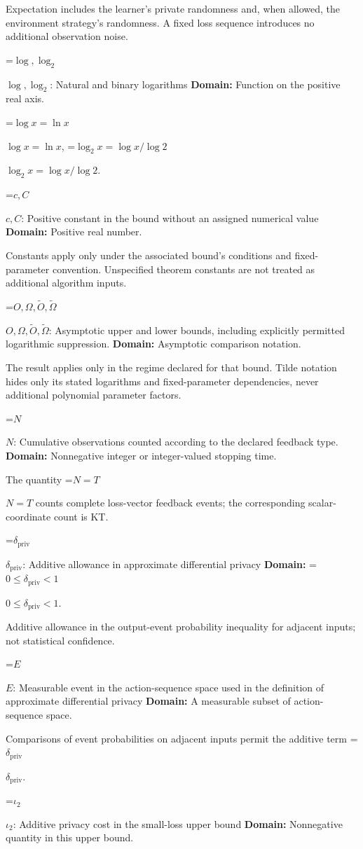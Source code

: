 \documentclass[10pt,a4paper]{article}
\newcommand{\AtlasMath}[1]{\par\begingroup\centering\setbox0=\hbox{$\displaystyle #1$}\ifdim\wd0>1.4\linewidth\typeout{ATLAS WIDE FORMULA: \the\wd0}\fi\ifdim\wd0>\linewidth\resizebox{\linewidth}{!}{\box0}\else\box0\fi\par\endgroup}
\newcommand{\AtlasInlineMath}[1]{\begingroup\setbox0=\hbox{$#1$}\ifdim\wd0>.4\linewidth\endgroup\AtlasMath{#1}\else\endgroup$#1$\fi}
\begin{document}
Expectation includes the learner's private randomness and, when allowed, the environment strategy's randomness. A fixed loss sequence introduces no additional observation noise.

\AtlasInlineMath{\log,\log_2}: Natural and binary logarithms \textbf{Domain:} Function on the positive real axis.

\AtlasInlineMath{\log x=\ln x}, \AtlasInlineMath{\log_2x=\log x/\log2}.

\AtlasInlineMath{c,C}: Positive constant in the bound without an assigned numerical value \textbf{Domain:} Positive real number.

Constants apply only under the associated bound’s conditions and fixed-parameter convention. Unspecified theorem constants are not treated as additional algorithm inputs.

\AtlasInlineMath{O,\Omega,\widetilde O,\widetilde\Omega}: Asymptotic upper and lower bounds, including explicitly permitted logarithmic suppression. \textbf{Domain:} Asymptotic comparison notation.

The result applies only in the regime declared for that bound. Tilde notation hides only its stated logarithms and fixed-parameter dependencies, never additional polynomial parameter factors.

\AtlasInlineMath{N}: Cumulative observations counted according to the declared feedback type. \textbf{Domain:} Nonnegative integer or integer-valued stopping time.

The quantity \AtlasInlineMath{N=T} counts complete loss-vector feedback events; the corresponding scalar-coordinate count is KT.

\AtlasInlineMath{\delta_{\mathrm{priv}}}: Additive allowance in approximate differential privacy \textbf{Domain:} \AtlasInlineMath{0\le\delta_{\mathrm{priv}}<1}.

Additive allowance in the output-event probability inequality for adjacent inputs; not statistical confidence.

\AtlasInlineMath{E}: Measurable event in the action-sequence space used in the definition of approximate differential privacy \textbf{Domain:} A measurable subset of action-sequence space.

Comparisons of event probabilities on adjacent inputs permit the additive term \AtlasInlineMath{\delta_{\mathrm{priv}}}.

\AtlasInlineMath{\iota_2}: Additive privacy cost in the small-loss upper bound \textbf{Domain:} Nonnegative quantity in this upper bound.
\end{document}
